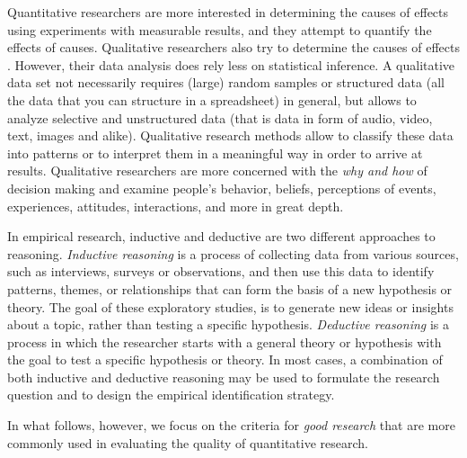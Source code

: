 \documentclass[
  12pt,
  oneside]{book}
\theoremstyle{definition}
\theoremstyle{definition}
\theoremstyle{definition}
\theoremstyle{definition}
\theoremstyle{remark}
\begin{document}
Quantitative researchers are more interested in determining the causes of effects using experiments with measurable results, and they attempt to quantify the effects of causes.
Qualitative researchers also try to determine the causes of effects . However, their data analysis does rely less on statistical inference. A qualitative data set not necessarily requires (large) random samples or structured data (all the data that you can structure in a spreadsheet) in general, but allows to analyze selective and unstructured data (that is data in form of audio, video, text, images and alike). Qualitative research methods allow to classify these data into patterns or to interpret them in a meaningful way in order to arrive at results.
Qualitative researchers are more concerned with the \emph{why and how} of decision making and examine people's behavior, beliefs, perceptions of events, experiences, attitudes, interactions, and more in great depth.

In empirical research, inductive and deductive are two different approaches to reasoning. \emph{Inductive reasoning} is a process of collecting data from various sources, such as interviews, surveys or observations, and then use this data to identify patterns, themes, or relationships that can form the basis of a new hypothesis or theory. The goal of these exploratory studies, is to generate new ideas or insights about a topic, rather than testing a specific hypothesis.
\emph{Deductive reasoning} is a process in which the researcher starts with a general theory or hypothesis with the goal to test a specific hypothesis or theory. In most cases, a combination of both inductive and deductive reasoning may be used to formulate the research question and to design the empirical identification strategy.

In what follows, however, we focus on the criteria for \emph{good research} that are more commonly used in evaluating the quality of quantitative research.
\end{document}
